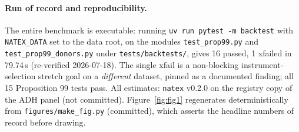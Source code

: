 \documentclass[11pt]{article}
\newcommand{\natex}{\texttt{natex}}
\begin{document}
\paragraph{Run of record and reproducibility.} The entire benchmark is
executable: running \texttt{uv run pytest -m backtest} with
\texttt{NATEX\_DATA} set to the data root, on the modules
\texttt{test\_prop99.py} and \texttt{test\_prop99\_donors.py} under
\texttt{tests/backtests/}, gives 16 passed, 1 xfailed in 79.74\,s
(re-verified 2026-07-18). The single xfail is a
non-blocking instrument-selection stretch goal on a \emph{different} dataset,
pinned as a documented finding; all 15 Proposition 99 tests pass. All estimates:
\natex{} v0.2.0 \cite{natex} on the registry copy of the ADH panel (not
committed). Figure~\ref{fig:fig1} regenerates deterministically from
\texttt{figures/make\_fig.py} (committed), which asserts the headline
numbers of record before drawing.
\end{document}
